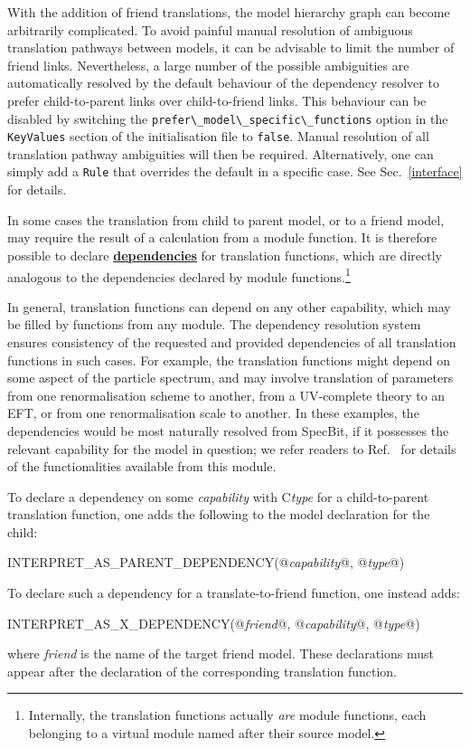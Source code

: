 \documentclass[pdftex,twocolumn,epjc3_preprint,runningheads]{svjour3}
\renewcommand{\_}{\discretionary{\underscore}{}{\underscore}}
\newcommand\yaml[1]{{\lstset{style=yaml}\lstinline!#1!\lstset{style=cpp}}}
\newcommand{\doublecross}[2]{\hyperref[#2]{\textbf{#1}}}
\newcommand{\metavarf}[1]{\textit{\color{darkgreen}\footnotesize\textrm{#1}}}
\newcommand{\metavar}{\metavarf}
\newcommand{\specbit}{\textsf{SpecBit}\xspace}
\newcommand\xx{\raisebox{0.2ex}{\smaller ++}\xspace}
\newcommand\Cpp{\textsf{C\xx}\xspace}
\begin{document}
With the addition of friend translations, the model hierarchy graph can become arbitrarily complicated.  To avoid painful manual resolution of ambiguous translation pathways between models, it can be advisable to limit the number of friend links. Nevertheless, a large number of the possible ambiguities are automatically resolved by the default behaviour of the dependency resolver to prefer child-to-parent links over child-to-friend links. This behaviour can be disabled by switching the \yaml{prefer\_model\_specific\_functions} option in the \yaml{KeyValues} section of the initialisation file to \yaml{false}. Manual resolution of all translation pathway ambiguities will then be required.  Alternatively, one can simply add a \yaml{Rule} that overrides the default in a specific case.  See Sec.\ \ref{interface} for details.

In some cases the translation from child to parent model, or to a friend model, may require the result of a calculation from a module function. It is therefore possible to declare \doublecross{dependencies}{dependency} for translation functions, which are directly analogous to the dependencies declared by module functions.\footnote{Internally, the translation functions actually {\it are} module functions, each belonging to a virtual module named after their source model.}

In general, translation functions can depend on any other capability, which may be filled by functions from any module.  The dependency resolution system ensures consistency of the requested and provided dependencies of all translation functions in such cases.  For example, the translation functions might depend on some aspect of the particle spectrum, and may involve translation of parameters from one renormalisation scheme to another, from a UV-complete theory to an EFT, or from one renormalisation scale to another.  In these examples, the dependencies would be most naturally resolved from \specbit, if it possesses the relevant capability for the model in question; we refer readers to Ref.\ \cite{SDPBit} for details of the functionalities available from this module.

To declare a dependency on some \metavar{capability} with \Cpp \metavar{type} for a child-to-parent translation function, one adds the following to the model declaration for the child:
\begin{lstcpp}
INTERPRET_AS_PARENT_DEPENDENCY(@\metavar{capability}@, @\metavar{type}@)
\end{lstcpp}
To declare such a dependency for a translate-to-friend function, one instead adds:
\begin{lstcpp}
INTERPRET_AS_X_DEPENDENCY(@\metavar{friend}@, @\metavar{capability}@, @\metavar{type}@)
\end{lstcpp}
where \metavar{friend} is the name of the target friend model.  These declarations must appear after the declaration of the corresponding translation function.
\end{document}
